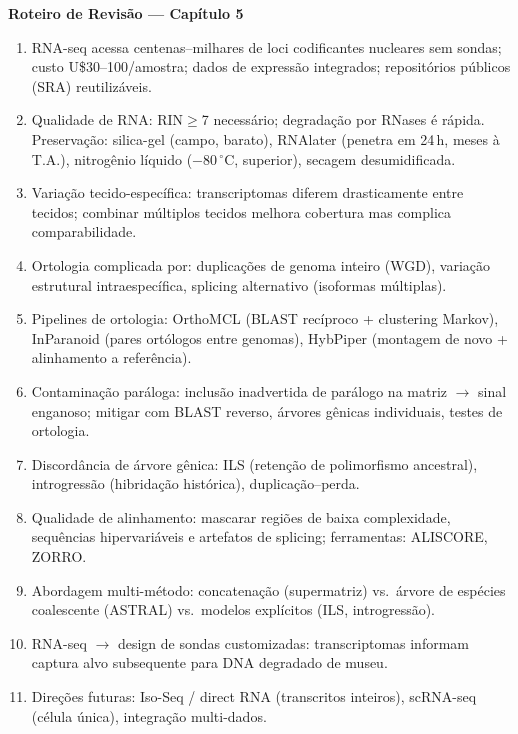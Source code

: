 \clearpage
\begin{destaque}
\textbf{Roteiro de Revisão --- Capítulo 5}
\begin{enumerate}
    \item RNA-seq acessa centenas--milhares de loci codificantes nucleares sem sondas; custo U\$30--100/amostra; dados de expressão integrados; repositórios públicos (SRA) reutilizáveis.
    \item Qualidade de RNA: RIN$\geq$7 necessário; degradação por RNases é rápida. Preservação: silica-gel (campo, barato), RNAlater (penetra em 24\,h, meses à T.A.), nitrogênio líquido ($-80\,^\circ$C, superior), secagem desumidificada.
    \item Variação tecido-específica: transcriptomas diferem drasticamente entre tecidos; combinar múltiplos tecidos melhora cobertura mas complica comparabilidade.
    \item Ortologia complicada por: duplicações de genoma inteiro (WGD), variação estrutural intraespecífica, splicing alternativo (isoformas múltiplas).
    \item Pipelines de ortologia: OrthoMCL (BLAST recíproco + clustering Markov), InParanoid (pares ortólogos entre genomas), HybPiper (montagem de novo + alinhamento a referência).
    \item Contaminação paráloga: inclusão inadvertida de parálogo na matriz $\to$ sinal enganoso; mitigar com BLAST reverso, árvores gênicas individuais, testes de ortologia.
    \item Discordância de árvore gênica: ILS (retenção de polimorfismo ancestral), introgressão (hibridação histórica), duplicação--perda.
    \item Qualidade de alinhamento: mascarar regiões de baixa complexidade, sequências hipervariáveis e artefatos de splicing; ferramentas: ALISCORE, ZORRO.
    \item Abordagem multi-método: concatenação (supermatriz) vs.\ árvore de espécies coalescente (ASTRAL) vs.\ modelos explícitos (ILS, introgressão).
    \item RNA-seq $\to$ design de sondas customizadas: transcriptomas informam captura alvo subsequente para DNA degradado de museu.
    \item Direções futuras: Iso-Seq / direct RNA (transcritos inteiros), scRNA-seq (célula única), integração multi-dados.
\end{enumerate}
\end{destaque}

\clearpage

\printbibliography[heading=subbibliography,title={Referências}]

